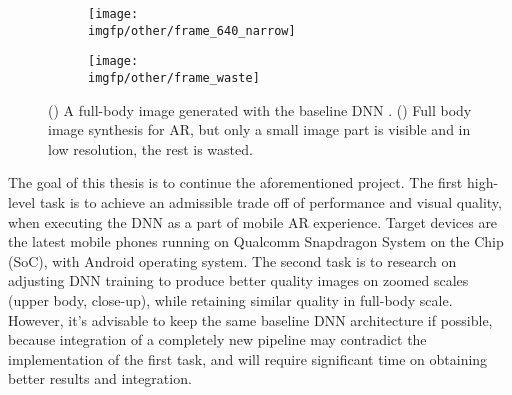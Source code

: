 \begin{figure}[h!]
	\fboxrule=2pt
	\centering
	\begin{subfigure}[b]{0.4\textwidth}
		\centering
		\texttt{[image: \\imgfp/other/frame\_640\_narrow]}
		\caption{}
		\label{intro:fig:stylepeople_frame:640}
	\end{subfigure}
	\hfill
	\begin{subfigure}[b]{0.59\textwidth}
		\centering
		\texttt{[image: \\imgfp/other/frame\_waste]}
		\caption{}
		\label{intro:fig:stylepeople_frame:waste}
	\end{subfigure}

	\caption{(\protect{}) A full-body image generated with the baseline DNN \cite{dnn:stylepeople21}. (\protect{}) Full body image synthesis for AR, but only a small image part is visible and in low resolution, the rest is wasted.}
	\label{intro:fig:stylepeople_frame}
\end{figure}
 
The goal of this thesis is to continue the aforementioned project. The first high-level task is to achieve an admissible trade off of performance and visual quality, when executing the DNN as a part of mobile AR experience. Target devices are the latest mobile phones running on Qualcomm Snapdragon System on the Chip (SoC), with Android operating system. The second task is to research on adjusting DNN training to produce better quality images on zoomed scales (upper body, close-up), while retaining similar quality in full-body scale. However, it's advisable to keep the same baseline \cite{dnn:stylepeople21} DNN architecture if possible, because integration of a completely new pipeline may contradict the implementation of the first task, and will require significant time on obtaining better results and integration.
 
